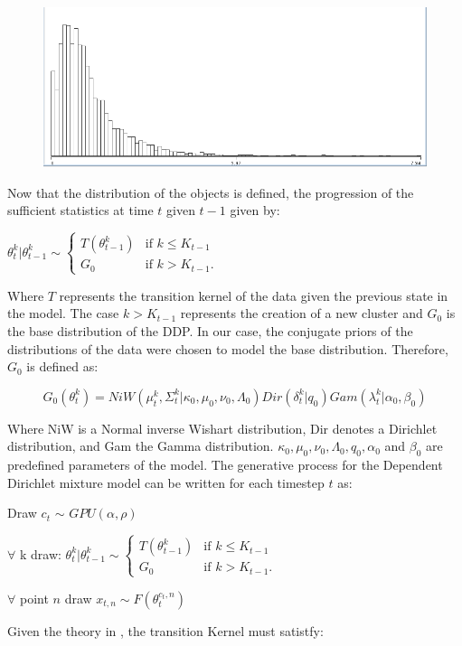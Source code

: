 \documentclass[]{article}
\begin{document}
\begin{figure}
    \centering
    \includegraphics[width=.25\textwidth]{Kullback-Leibler}
    \label{pcl:kl}
\end{figure}


Now that the distribution of the objects is defined, the progression of the sufficient statistics at time $t$ given $t-1$ given by:

$\theta_t^k | \theta_{t-1}^k \sim
\begin{cases} T (\theta_{t-1}^k) &\mbox{if } k \leq K_{t-1} \\
G_0 & \mbox{if } k > K_{t-1}. \end{cases}$

Where $T$ represents the transition kernel of the data given the previous state in the model. The case $ k > K_{t-1} $ represents the creation of a new cluster and $G_0$ is the base distribution of the DDP. In our case, the conjugate priors of the distributions of the data were chosen to model the base distribution. Therefore, $G_0$ is defined as:

$$ G_0(\theta_t^k)  = NiW( \mu_t^k, \Sigma_t^k | \kappa_0, \mu_0, \nu_0, \Lambda_0 ) Dir(\delta_t^k | q_0) Gam( \lambda_t^k | \alpha_0, \beta_0) $$

Where NiW is a Normal inverse Wishart distribution, Dir denotes a Dirichlet distribution, and Gam the Gamma distribution. $ \kappa_0, \mu_0, \nu_0, \Lambda_0, q_0,\alpha_0$ and $\beta_0$ are predefined parameters of the model. The generative process for the Dependent Dirichlet mixture model can be written for each timestep $t$ as:


\begin{compactitem}
\item Draw  $c_t$ $\sim$ $GPU(\alpha, \rho) $
\item $\forall$  k draw: $ \theta_t^k | \theta_{t-1}^k \sim
    \begin{cases} T (\theta_{t-1}^k) &\mbox{if } k \leq K_{t-1} \\
G_0 & \mbox{if } k > K_{t-1}. \end{cases}$
\item $\forall$  point $n$ draw $ x_{t,n} \sim F(\theta_t^{c_t,n})$
\end{compactitem}

Given the theory in \cite{caron}, the transition Kernel must satistfy:
\end{document}
